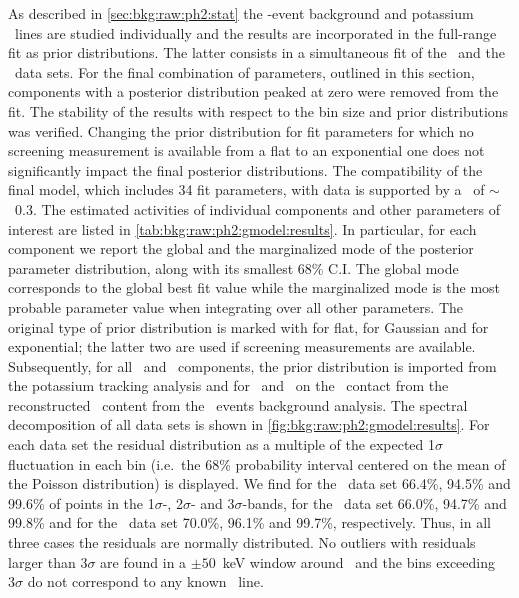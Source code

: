 As described in \cref{sec:bkg:raw:ph2:stat} the \a-event background and
potassium \g\ lines are studied individually and the results are incorporated in the
full-range fit as prior distributions.  The latter consists in a simultaneous fit of the
\Mone\ and the \Mtwo\ data sets. For the final combination of parameters, outlined in this
section, components with a posterior distribution peaked at zero were removed from the
fit. The stability of the results with respect to the bin size and prior distributions was
verified. Changing the prior distribution for fit parameters for which no screening
measurement is available from a flat to an exponential one does not significantly impact
the final posterior distributions. The compatibility of the final model, which includes 34
fit parameters, with data is supported by a \pvalue\ of $\sim$~0.3.
\newpar
The estimated activities of individual components and other parameters of interest are
listed in \cref{tab:bkg:raw:ph2:gmodel:results}. In particular, for each component we
report the global and the marginalized mode of the posterior parameter distribution, along
with its smallest 68\% C.I. The global mode corresponds to the global best fit value while
the marginalized mode is the most probable parameter value when integrating over all other
parameters. The original type of prior distribution is marked with \m{[f]} for flat,
\m{[g]} for Gaussian and \m{[e]} for exponential; the latter two are used if screening
measurements are available. Subsequently, for all \kvn\ and \kvz\ components, the prior
distribution is imported from the potassium tracking analysis and for \Pbh\ and \Bih\ on
the \pplus\ contact from the reconstructed \Ra\ content from the \a\ events background
analysis.
\newpar
The spectral decomposition of all data sets is shown in
\cref{fig:bkg:raw:ph2:gmodel:results}. For each data set the residual distribution as a
multiple of the expected 1$\sigma$ fluctuation in each bin (i.e.~the 68\% probability
interval centered on the mean of the Poisson distribution) is displayed. We find for the
\enrBEGeII\ data set 66.4\%, 94.5\% and 99.6\% of points in the 1$\sigma$-, 2$\sigma$- and
3$\sigma$-bands, for the \enrCoaxII\ data set 66.0\%, 94.7\% and 99.8\% and for the
\enrGeII\ data set 70.0\%, 96.1\% and 99.7\%, respectively. Thus, in all three cases the
residuals are normally distributed. No outliers with residuals larger than $3\sigma$ are
found in a $\pm50$~keV window around \qbb\ and the bins exceeding $3\sigma$ do not
correspond to any known \g\ line.


